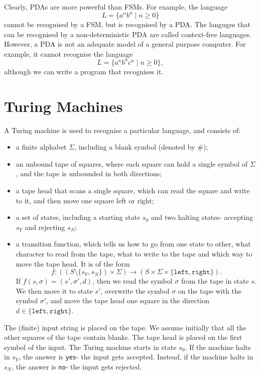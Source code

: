 \documentclass[a4paper, openany]{memoir}
\begin{document}
Clearly, PDAs are more powerful than FSMs. For example, the language
\[L = \{a^n b^n \mid n \geq 0\}\]
cannot be recognised by a FSM, but is recognised by a PDA. The languges that can be recognised by a non-deterministic PDA are called context-free languages. However, a PDA is not an adequate model of a general purpose computer. For example, it cannot recognise the language
\[L = \{a^n b^n c^n \mid n \geq 0\},\]
although we can write a program that recognises it.
\newpage

\section{Turing Machines}
A Turing machine is used to recognise a particular language, and consists of:
\begin{itemize}
    \item a finite alphabet $\Sigma$, including a blank symbol (denoted by \#);
    \item an unbound tape of squares, where each square can hold a single symbol of $\Sigma$, and the tape is unbounded in both directions;
    \item a tape head that scans a single square, which can read the square and write to it, and then move one square left or right;
    \item a set of states, including a starting state $s_0$ and two halting states- accepting $s_Y$ and rejecting $s_N$;
    \item a transition function, which tells us how to go from one state to other, what character to read from the tape, what to write to the tape and which way to move the tape head. It is of the form
    \[f: ((S \setminus \{s_Y, s_N\}) \times \Sigma) \to (S \times \Sigma \times \{\texttt{left}, \texttt{right}\}).\]
    If $f(s, \sigma) = (s', \sigma', d)$, then we read the symbol $\sigma$ from the tape in state $s$. We then move it to state $s'$, overwrite the symbol $\sigma$ on the tape with the symbol $\sigma'$, and move the tape head one square in the direction $d \in \{\texttt{left}, \texttt{right}\}$.
\end{itemize}
The (finite) input string is placed on the tape. We assume initially that all the other squares of the tape contain blanks. The tape head is placed on the first symbol of the input. The Turing machine starts in state $s_0$. If the machine halts in $s_Y$, the answer is \texttt{yes}- the input gets accepted. Instead, if the machine halts in $s_N$, the answer is \texttt{no}- the input gets rejected.
\end{document}
